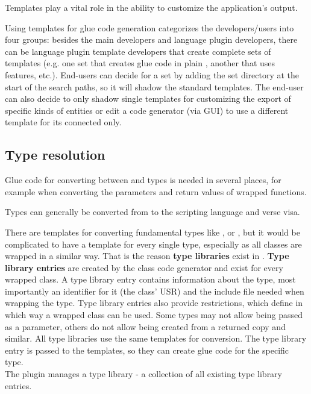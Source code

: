 Templates play a vital role in the ability to customize the application's output.

Using templates for glue code generation categorizes the developers/users into four groups: besides the  main developers and language plugin developers, there can be language plugin template developers that create complete sets of templates (e.g. one set that creates glue code in plain , another that uses  features, etc.).  End-users can decide for a set by adding the set directory at the start of the search paths, so it will shadow the standard templates. The end-user can also decide to only shadow single templates for customizing the export of specific kinds of entities or edit a code generator (via GUI) to use a different template for its connected  only.

\subsection{Type resolution}

Glue code for converting between  and  types is needed in several places, for example when converting the parameters and return values of wrapped functions.

Types can generally be converted from  to the scripting language and verse visa.

There are templates for converting fundamental types like ,  or , but it would be complicated to have a template for every single type, especially as all classes are wrapped in a similar way. That is the reason \textbf{type libraries} exist in . \textbf{Type library entries} are created by the class code generator and exist for every wrapped class. A type library entry contains information about the type, most importantly an identifier for it (the class' USR) and the include file needed when wrapping the type. Type library entries also provide restrictions, which define in which way a wrapped class can be used. Some types may not allow being passed as a parameter, others do not allow being created from a returned copy and similar. All type libraries use the same templates for conversion. The type library entry is passed to the templates, so they can create glue code for the specific type.\\
The plugin manages a type library -  a collection of all existing type library entries.

